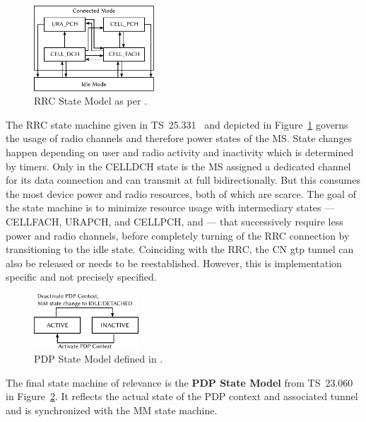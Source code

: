 \begin{figure}[htb] 
	\centering
	\includegraphics[width=0.4\textwidth]{images/rrc-state-model.pdf}
	\caption{\acrshort{RRC} State Model as per \cite[Section~7.1]{3gpp.25.331}.}
	\label{c4:fig:rrcstatemodel}
\end{figure}

 The \gls{RRC} state machine given in \gls{TS}~25.331~\cite[Section~7.1]{3gpp.25.331} and depicted in Figure~\ref{c4:fig:rrcstatemodel} governs the usage of radio channels and therefore power states of the \gls{MS}. State changes happen depending on user and radio activity and inactivity which is determined by timers. Only in the \gls{CELLDCH} state is the \gls{MS} assigned a dedicated channel for its data connection and can transmit at full bidirectionally. But this consumes the most device power and radio resources, both of which are scarce. The goal of the state machine is to minimize resource usage with intermediary states --- \gls{CELLFACH}, \gls{URAPCH}, and \gls{CELLPCH}, and  --- that successively require less power and radio channels, before completely turning of the \gls{RRC} connection by transitioning to the idle state. Coinciding with the \gls{RRC}, the \gls{CN} \gls{gtp} tunnel can also be released or needs to be reestablished. However, this is implementation specific and not precisely specified.

\begin{figure}[htb]
	\centering
	\includegraphics[width=0.35\textwidth]{images/pdp-state-model.pdf}
	\caption{\acrshort{PDP} State Model defined in \cite[Section~9]{3gpp.23.060}.}
\label{c4:fig:pdpstatemodel}
\end{figure}

The final state machine of relevance is the \textbf{\gls{PDP} State Model} from \gls{TS}~23.060~\cite[Section~9]{3gpp.23.060} in Figure~\ref{c4:fig:pdpstatemodel}. It reflects the actual state of the \gls{PDP} context and associated tunnel and is synchronized with the \gls{MM} state machine.


